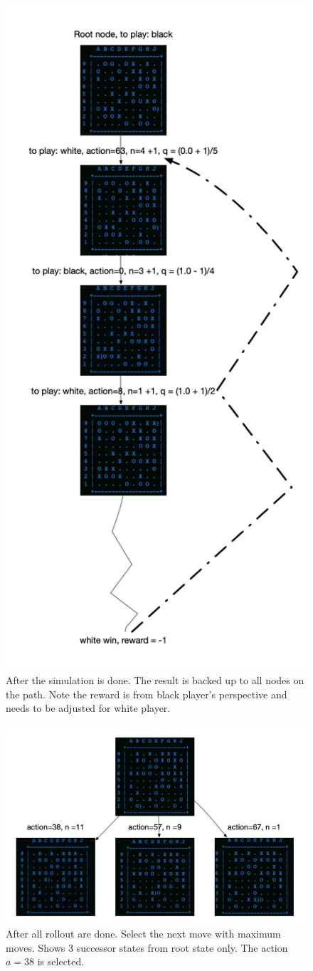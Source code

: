 \documentclass{article}
\begin{document}
\begin{figure}
\centering
\includegraphics[width=0.7\linewidth]{mctsbackup}
\caption{After the simulation is done. The result is backed up to all nodes on the path. Note the reward is from black player's perspective and needs to be adjusted for white player.}
\label{fig:mctsbackup}

\end{figure}
\begin{figure}
\centering
\includegraphics[width=0.9\linewidth]{mctsfinal}
\caption{After all rollout are done. Select the next move with maximum moves. Shows 3 successor states from root state only. The action $a=38$ is selected.}
\label{fig:mctsfinal}
\end{figure}
\end{document}

